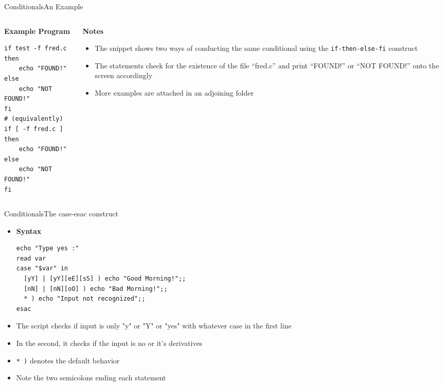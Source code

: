 \documentclass{beamer}
\begin{document}
\begin{frame}[fragile]{Conditionals}{An Example}
\begin{columns}
  \begin{column}{0.5\textwidth}
    \textbf{Example Program}\\
\begin{verbatim}
if test -f fred.c
then
    echo "FOUND!"
else
    echo "NOT FOUND!"
fi
# (equivalently)
if [ -f fred.c ]
then
    echo "FOUND!"
else
    echo "NOT FOUND!"
fi
\end{verbatim}
  \end{column}
  \begin{column}{0.5\textwidth}
    \textbf{Notes}
    \begin{itemize}
    \item The snippet shows two ways of conducting the same
      conditional using the \verb|if-then-else-fi| construct
    \item The statements check for the existence of the file
      ``fred.c'' and print ``FOUND!'' or ``NOT FOUND!'' onto the
      screen accordingly
    \item More examples are attached in an adjoining folder
    \end{itemize}
  \end{column}
\end{columns}
\end{frame}

\begin{frame}[fragile]{Conditionals}{The case-esac construct}
  \begin{itemize}
  \item \textbf{Syntax}\\
\begin{verbatim}
echo "Type yes :"
read var
case "$var" in
  [yY] | [yY][eE][sS] ) echo "Good Morning!";;
  [nN] | [nN][oO] ) echo "Bad Morning!";;
  * ) echo "Input not recognized";;
esac
\end{verbatim}
  \item The script checks if input is only "y" or "Y" or "yes" with
    whatever case in the first line
  \item In the second, it checks if the input is no or it's
    derivatives
  \item \verb|* )| denotes the default behavior
  \item Note the two semicolons ending each statement
  \end{itemize}
\end{frame}
\end{document}
